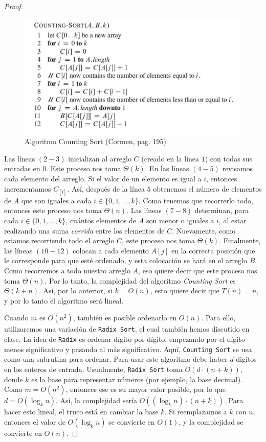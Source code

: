 \documentclass[letterpaper,11pt]{article}
\begin{document}
\begin{enumerate}
\begin{proof}
        \begin{figure}[h]
            \centering
            \includegraphics[width=0.55\linewidth]
            {imagenes/counting-sort-normal.jpeg}
            \caption{Algoritmo Counting Sort (Cormen, pag. 195)}
            \label{fig:counting-sort-normal}
        \end{figure}

        Las líneas $(2 - 3)$ inicializan al arreglo $C$ (creado en la línea $1$)
        con todas sus entradas en $0$. Este proceso nos toma $\Theta(k)$. En las 
        líneas $(4 - 5)$ revisamos cada elemento del arreglo. Si el valor de 
        un elemento es igual a $i$, entonces incrementamos $C_{[i]}$. Así, 
        después de la línea $5$ obtenemos el número de elementos de $A$ que son 
        iguales a cada $i \in \{0, 1, ..., k\}$. Como tenemos que recorrerlo 
        todo, entonces este proceso nos toma $\Theta(n)$. Las líneas $(7 - 8)$ 
        determinan, para cada $i \in \{0, 1, ..., k\}$, cuántos elementos de 
        $A$ son menor o iguales a $i$, al estar realizando una suma 
        \textit{corrida} entre los elementos de $C$. Nuevamente, como estamos 
        recorriendo todo el arreglo $C$, este proceso nos toma $\Theta(k)$. 
        Finalmente, las líneas $(10 - 12)$ colocan a cada elemento $A[j]$ en 
        la correcta posición que le corresponde para que esté ordenado, y esta 
        colocación se hará en el arreglo $B$. Como recorremos a todo nuestro
        arreglo $A$, eso quiere decir que este proceso nos toma $\Theta(n)$. 
        Por lo tanto, la complejidad del algoritmo \textit{Counting Sort} es 
        $\Theta(k + n)$. Así, por lo anterior, si $k = O(n)$, esto quiere 
        decir que $T(n) = n$, y por lo tanto el algoritmo será lineal. 

        Cuando $m$ es $O(n^2)$, también es posible ordenarlo en $O(n)$. Para 
        ello, utilizaremos una variación de \texttt{Radix Sort}, el cual 
        también hemos discutido en clase. La idea de \texttt{Radix} es ordenar
        dígito por dígito, empezando por el dígito menos significativo y 
        pasando al más significativo. Aquí, \texttt{Counting Sort} se usa como 
        una subrutina para ordenar. Para usar este algoritmo debe haber $d$ 
        digitos en los enteros de entrada. Usualmente, \texttt{Radix Sort} toma 
        $O(d \cdot (n + k))$, donde $k$ es la base para representar números 
        (por ejemplo, la base decimal). Como $m = O(n^2)$, entonces ese es su 
        mayor valor posible, por lo que $d = O(\log_k n)$. Así, la complejidad 
        sería $O((\log_k n) \cdot (n + k))$. Para hacer esto lineal, el truco 
        está en cambiar la base $k$. Si reemplazamos a $k$ con $n$, entonces 
        el valor de $O(\log_k n)$ se convierte en $O(1)$, y la complejidad se 
        convierte en $O(n)$. 


\end{proof}
\end{enumerate}
\end{document}
